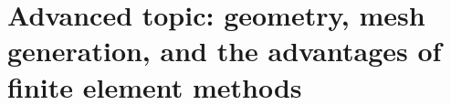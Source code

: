 \chapter{Advanced topic: geometry, mesh generation, and the advantages of finite element methods}


